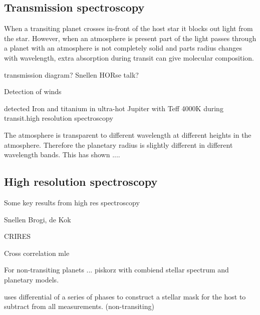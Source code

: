 


\subsection{Transmission spectroscopy}
When a transiting planet crosses in-front of the host star it blocks out light from the star. However, when an atmosphere is present part of the light passes through  a planet with an atmosphere is not completely solid and parts
radius changes with wavelength, extra absorption during transit can give molecular composition.


transmission diagram? Snellen HORse talk?

Detection of winds



\citep{hoeijmakers_atomic_2018} detected Iron and titanium in ultra-hot Jupiter with Teff 4000K during transit.high resolution spectroscopy


The atmosphere is transparent to different wavelength at different heights in the atmosphere. Therefore the planetary radius is slightly different in different wavelength bands. This has shown ....



\subsection{High resolution spectroscopy}
Some key results from high res spectroscopy

Snellen  Brogi, de Kok

CRIRES  

Cross correlation mle  \citet{piskorz_evidence_2016}


For non-transiting planets ...  piskorz   with combiend stellar spectrum and planetary models.


\citet{rodler_weighing_2012} uses differential of a series of phases to construct a stellar mask for the host to subtract from all measurements. (non-transiting)
